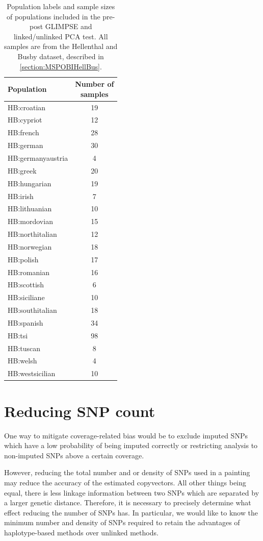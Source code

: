 {\begin{table}
\centering
\begin{tabular}[t]{lc}
\toprule
Population & \thead{Number of\\ samples}\\
\midrule
HB:croatian & 19\\
HB:cypriot & 12\\
HB:french & 28\\
HB:german & 30\\
HB:germanyaustria & 4\\
HB:greek & 20\\
HB:hungarian & 19\\
HB:irish & 7\\
HB:lithuanian & 10\\
HB:mordovian & 15\\
HB:northitalian & 12\\
HB:norwegian & 18\\
HB:polish & 17\\
HB:romanian & 16\\
HB:scottish & 6\\
HB:siciliane & 10\\
HB:southitalian & 18\\
HB:spanish & 34\\
HB:tsi & 98\\
HB:tuscan & 8\\
HB:welsh & 4\\
HB:westsicilian & 10\\
\bottomrule
\end{tabular}
\caption{Population labels and sample sizes of populations included in the pre-post GLIMPSE and linked/unlinked PCA test. All samples are from the Hellenthal and Busby dataset, described in \ref{section:MSPOBIHellBus}.}
\label{tab:HB_pops}
\end{table}


\section{Reducing SNP count} \label{sec:ReducingSNPcount}

One way to mitigate coverage-related bias would be to exclude imputed SNPs which have a low probability of being imputed correctly or restricting analysis to non-imputed SNPs above a certain coverage.

However, reducing the total number and or density of SNPs used in a painting may reduce the accuracy of the estimated copyvectors. All other things being equal, there is less linkage information between two SNPs which are separated by a larger genetic distance. Therefore, it is necessary to precisely determine what effect reducing the number of SNPs has. In particular, we would like to know the minimum number and density of SNPs required to retain the advantages of haplotype-based methods over unlinked methods. 

}
